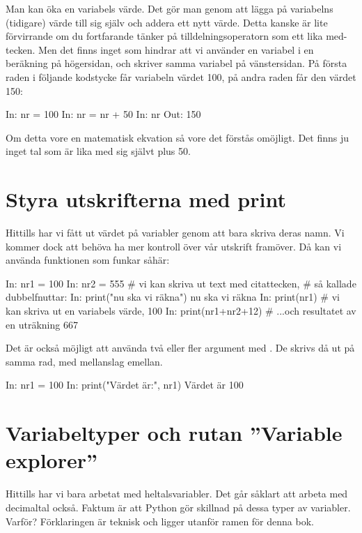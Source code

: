 Man kan öka en variabels värde. Det gör man genom att lägga på variabelns (tidigare) värde till sig själv och addera ett nytt värde. Detta kanske är lite förvirrande om du fortfarande tänker på tilldelningsoperatorn som ett lika med-tecken. Men det finns inget som hindrar att vi använder en variabel i en beräkning på högersidan, och skriver samma variabel på vänstersidan. På första raden i följande kodstycke får variabeln  värdet 100, på andra raden får den värdet 150:

\begin{python}[caption={Öka värdet på variabeln},label={}]
In: nr = 100
In: nr = nr + 50
In: nr
Out: 150
\end{python}

Om detta vore en matematisk ekvation så vore det förstås omöjligt. Det finns ju inget tal som är lika med sig självt plus 50.


\section{Styra utskrifterna med print}

Hittills har vi fått ut värdet på variabler genom att bara skriva deras namn. Vi kommer dock att behöva ha mer kontroll över vår utskrift framöver. Då kan vi använda funktionen  som funkar såhär:

\begin{python}[caption={Skriv ut på kommando},label={}]
In: nr1 = 100
In: nr2 = 555
# vi kan skriva ut text med citattecken,
# så kallade dubbelfnuttar:
In: print("nu ska vi räkna")
nu ska vi räkna
In: print(nr1) # vi kan skriva ut en variabels värde,
100
In: print(nr1+nr2+12) # ...och resultatet av en uträkning
667
\end{python}
\newpage
Det är också möjligt att använda två eller fler argument med . De skrivs då ut på samma rad, med mellanslag emellan.

\begin{python}[caption={Skriv ut på kommando},label={}]
In: nr1 = 100
In: print("Värdet är:", nr1)
Värdet är 100
\end{python}



\section{Variabeltyper och rutan ''Variable explorer''}\label{sec:variabeltyper}
Hittills har vi bara arbetat med heltalsvariabler. Det går såklart att arbeta med decimaltal också. Faktum är att Python gör skillnad på dessa typer av variabler. Varför? Förklaringen är teknisk och ligger utanför ramen för denna bok.

